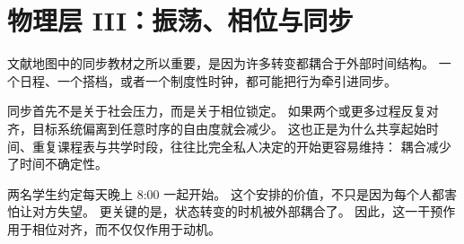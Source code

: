 \section{物理层 III：振荡、相位与同步}

文献地图中的同步教材之所以重要，是因为许多转变都耦合于外部时间结构。
一个日程、一个搭档，或者一个制度性时钟，都可能把行为牵引进同步。

\begin{discussion}
同步首先不是关于社会压力，而是关于相位锁定。
如果两个或更多过程反复对齐，目标系统偏离到任意时序的自由度就会减少。
这也正是为什么共享起始时间、重复课程表与共学时段，往往比完全私人决定的开始更容易维持：
耦合减少了时间不确定性。
\end{discussion}

\begin{example}[共学作为相位控制]
两名学生约定每天晚上 8:00 一起开始。
这个安排的价值，不只是因为每个人都害怕让对方失望。
更关键的是，状态转变的时机被外部耦合了。
因此，这一干预作用于相位对齐，而不仅仅作用于动机。
\end{example}